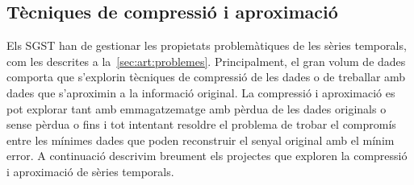 \subsection{Tècniques de compressió i aproximació}




Els \gls{SGST} han de gestionar les propietats problemàtiques de les
sèries temporals, com les descrites a
la~\autoref{sec:art:problemes}. Principalment, el gran volum de dades
comporta que s'explorin tècniques de compressió de les dades o de
treballar amb dades que s'aproximin a la informació original.  La
compressió i aproximació es pot explorar tant amb emmagatzematge amb
pèrdua de les dades originals o sense pèrdua o fins i tot intentant
resoldre el problema de trobar el compromís entre les mínimes dades
que poden reconstruir el senyal original amb el mínim error. A
continuació descrivim breument els projectes que exploren la
compressió i aproximació de sèries temporals.




